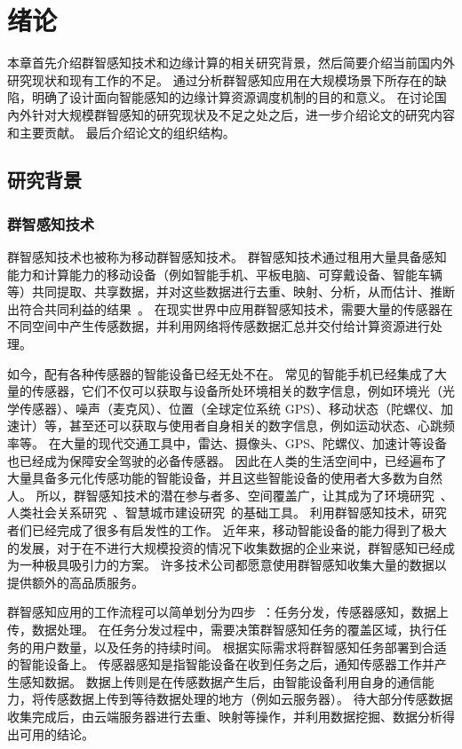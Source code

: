 \chapter{绪论}
本章首先介绍群智感知技术和边缘计算的相关研究背景，然后简要介绍当前国内外研究现状和现有工作的不足。
通过分析群智感知应用在大规模场景下所存在的缺陷，明确了设计面向智能感知的边缘计算资源调度机制的目的和意义。
在讨论国內外针对大规模群智感知的研究现状及不足之处之后，进一步介绍论文的研究内容和主要贡献。
最后介绍论文的组织结构。

\section{研究背景}

\subsection{群智感知技术}

群智感知技术也被称为移动群智感知技术。
群智感知技术通过租用大量具备感知能力和计算能力的移动设备（例如智能手机、平板电脑、可穿戴设备、智能车辆等）共同提取、共享数据，并对这些数据进行去重、映射、分析，从而估计、推断出符合共同利益的结果~\cite{DBLP:journals/cm/GantiYL11}。
在现实世界中应用群智感知技术，需要大量的传感器在不同空间中产生传感数据，并利用网络将传感数据汇总并交付给计算资源进行处理。

如今，配有各种传感器的智能设备已经无处不在。
常见的智能手机已经集成了大量的传感器，它们不仅可以获取与设备所处环境相关的数字信息，例如环境光（光学传感器）、噪声（麦克风）、位置（全球定位系统 GPS）、移动状态（陀螺仪、加速计）等，甚至还可以获取与使用者自身相关的数字信息，例如运动状态、心跳频率等。
在大量的现代交通工具中，雷达、摄像头、GPS、陀螺仪、加速计等设备也已经成为保障安全驾驶的必备传感器。
因此在人类的生活空间中，已经遍布了大量具备多元化传感功能的智能设备，并且这些智能设备的使用者大多数为自然人。
所以，群智感知技术的潜在参与者多、空间覆盖广，让其成为了环境研究~\cite{DBLP:conf/sensys/DuttaAKMMWW09}、人类社会关系研究~\cite{DBLP:conf/globecom/AslIAM13}、智慧城市建设研究~\cite{DBLP:journals/cm/WangZWCHM16}的基础工具。
利用群智感知技术，研究者们已经完成了很多有启发性的工作。
近年来，移动智能设备的能力得到了极大的发展，对于在不进行大规模投资的情况下收集数据的企业来说，群智感知已经成为一种极具吸引力的方案。
许多技术公司都愿意使用群智感知收集大量的数据以提供额外的高品质服务。

群智感知应用的工作流程可以简单划分为四步~\cite{zh_cn:shi}：任务分发，传感器感知，数据上传，数据处理。
在任务分发过程中，需要决策群智感知任务的覆盖区域，执行任务的用户数量，以及任务的持续时间。
根据实际需求将群智感知任务部署到合适的智能设备上。
传感器感知是指智能设备在收到任务之后，通知传感器工作并产生感知数据。
数据上传则是在传感数据产生后，由智能设备利用自身的通信能力，将传感数据上传到等待数据处理的地方（例如云服务器）。
待大部分传感数据收集完成后，由云端服务器进行去重、映射等操作，并利用数据挖掘、数据分析得出可用的结论。

